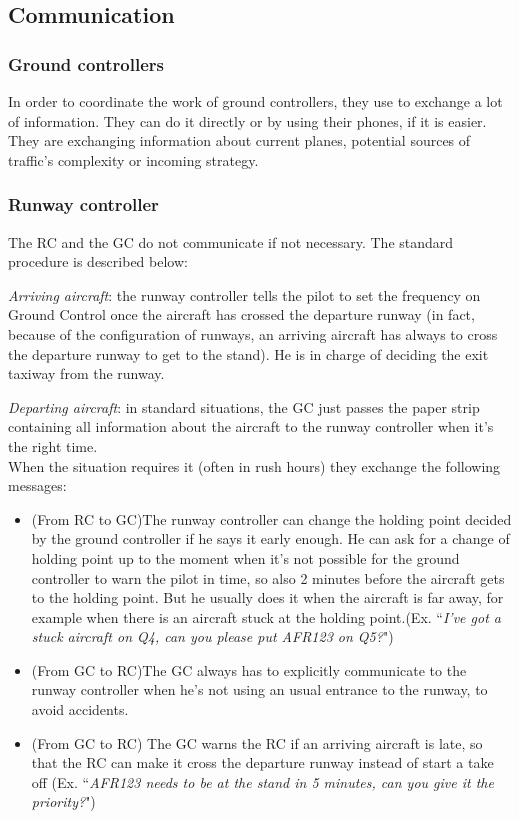 \documentclass{article}
\begin{document}
\subsection{Communication}
\subsubsection*{Ground controllers}
In order to coordinate the work of ground controllers, they use to exchange a lot of information. They can do it directly or by using their phones, if it is easier. They are exchanging information about current planes, potential sources of traffic's complexity or incoming strategy.

\subsubsection*{Runway controller}
The RC and the GC do not communicate if not necessary. The standard procedure is described below:

\textit{Arriving aircraft}: the runway controller tells the pilot to set the frequency on Ground Control once the aircraft has crossed the departure runway (in fact, because of the configuration of runways, an arriving aircraft has always to cross the departure runway to get to the stand). 
He is in charge of deciding the exit taxiway from the runway.


\textit{Departing aircraft}: in standard situations, the GC just passes the paper strip containing all information about the aircraft to the runway controller when it's the right time.
\\

When the situation requires it (often in rush hours) they exchange the following messages:
\begin{itemize}
	\item (From RC to GC)The runway controller can change the holding point decided by the ground controller if he says it early enough. He can ask for a change of holding point up to the moment when it's not possible for the ground controller to warn the pilot in time, so also 2 minutes before the aircraft gets to the holding point. But he usually does it when the aircraft is far away, for example when there is an aircraft stuck at the holding point.(Ex. ``\textit{I've got a stuck aircraft on Q4, can you please put AFR123 on Q5?}")
	
	\item(From GC to RC)The GC always has to explicitly communicate to the runway controller when he's not using an usual entrance to the runway, to avoid accidents. 
	
	\item(From GC to RC) The GC warns the RC if an arriving aircraft is late, so that the RC can make it cross the departure runway instead of start a take off (Ex. ``\textit{AFR123 needs to be at the stand in 5 minutes, can you give it the priority?}")
\end{itemize}
\end{document}
